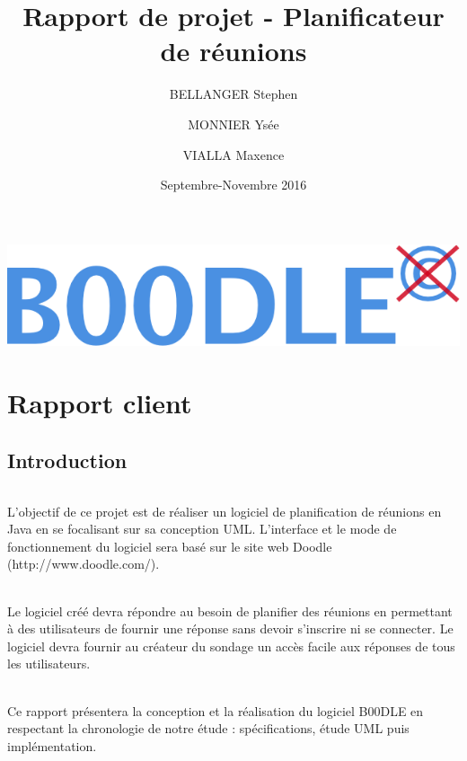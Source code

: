 \documentclass[]{report}
\title{Rapport de projet - Planificateur de réunions}
\author{BELLANGER Stephen \and
		MONNIER Ysée \and
		VIALLA Maxence}
\date{Septembre-Novembre 2016}
\begin{document}
\begin{titlepage}
	\begin{center}
	
	\includegraphics[scale=0.5]{figures/Logo_B00DLE.png}
	\maketitle
	\end{center}
\end{titlepage}
\part{Rapport client}

\tableofcontents

\chapter{Introduction}

\paragraph{}
	L'objectif de ce projet est de réaliser un logiciel de planification de réunions en Java en se focalisant sur sa conception UML. L'interface et le mode de fonctionnement du logiciel sera basé sur le site web Doodle (http://www.doodle.com/). 
	\paragraph{}
	Le logiciel créé devra répondre au besoin de planifier des réunions en permettant à des utilisateurs de fournir une réponse sans devoir s'inscrire ni se connecter. Le logiciel devra fournir au créateur du sondage un accès facile aux réponses de tous les utilisateurs.
	\paragraph{}
	Ce rapport présentera la conception et la réalisation du logiciel B00DLE en respectant la chronologie de notre étude : spécifications, étude UML puis implémentation.
\end{document}
